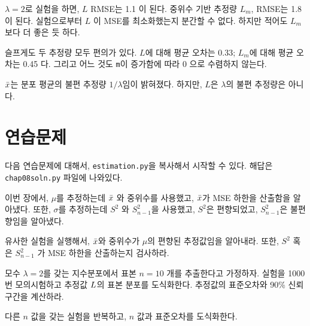 $\lambda=2$로 실험을 하면, $L$ RMSE는 1.1 이 된다.
중위수 기반 추정량 $L_m$, RMSE는 1.8 이 된다.
실험으로부터 $L$ 이 MSE를 최소화했는지 분간할 수 없다.
하지만 적어도 $L_m$ 보다 더 좋은 듯 하다.

슬프게도 두 추정량 모두 편의가 있다. $L$에 대해 평균 오차는 0.33; 
$L_m$에 대해 평균 오차는 0.45 다. 그리고 어느 것도 {\tt m}이 증가함에 따라 0 으로 수렴하지 않는다.

$\bar{x}$는 분포 평균의 불편 추정량 $1 / \lambda$임이 밝혀졌다. 하지만,
$L$은 $\lambda$의 불편 추정량은 아니다.

\section{연습문제}

다음 연습문제에 대해서, {\tt estimation.py}을 복사해서 시작할 수 있다.
해답은 \verb"chap08soln.py" 파일에 나와있다.

\begin{exercise}

이번 장에서, $\mu$를 추정하는데 $\bar{x}$ 와 중위수를 사용했고,
$\bar{x}$가 MSE 하한을 산출함을 알아냈다.
또한, $\sigma$를 추정하는데 $S^2$ 와 $S_{n-1}^2$을 사용했고,
$S^2$은 편향되었고, $S_{n-1}^2$은 불편향임을 알아냈다.

유사한 실험을 실행해서, $\bar{x}$와 중위수가 $\mu$의 편향된 추정값임을 알아내라.
또한, $S^2$ 혹은 $S_{n-1}^2$ 가 MSE 하한을 산출하는지 검사하라.


\end{exercise}


\begin{exercise}

모수 $\lambda=2$를 갖는 지수분포에서 표본 $n=10$ 개를 추출한다고 가정하자.
실험을 1000번 모의시험하고 추정값 $L$의 표본 분포를 도식화한다.
추정값의 표준오차와 90\% 신뢰구간을 계산하라.


다른 $n$ 값을 갖는 실험을 반복하고, $n$ 값과 표준오차를 도식화한다.


\end{exercise}


